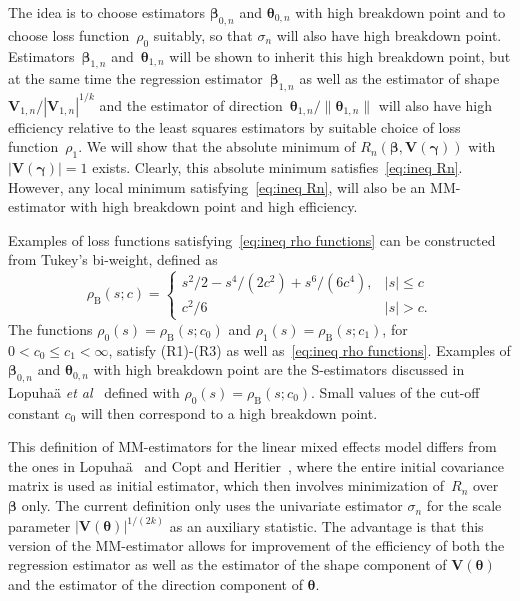 \documentclass{article}
\numberwithin{equation}{section}
\theoremstyle{plain}
\newcommand{\bbeta}{\bm\beta}
\newcommand{\btheta}{\bm\theta}
\newcommand{\bgamma}{\bm\gamma}
\newcommand{\bV}{\mathbf{V}}
\begin{document}
The idea is to choose estimators $\bbeta_{0,n}$ and $\btheta_{0,n}$ with high breakdown point
and to choose loss function~$\rho_0$ suitably, so that $\sigma_n$ will also have high breakdown point.
Estimators~$\bbeta_{1,n}$ and~$\btheta_{1,n}$ will be shown to inherit this high breakdown point, 
but at the same time the regression estimator~$\bbeta_{1,n}$ as well as the estimator of shape $\bV_{1,n}/|\bV_{1,n}|^{1/k}$
and the estimator of direction~$\btheta_{1,n}/\|\btheta_{1,n}\|$ will also have high efficiency relative to the least squares estimators
by suitable choice of loss function~$\rho_1$.
We will show that the absolute minimum of $R_n(\bbeta,\bV(\bgamma))$ with $|\bV(\bgamma)|=1$ exists.
Clearly, this absolute minimum satisfies~\eqref{eq:ineq Rn}.
However, any local minimum satisfying~\eqref{eq:ineq Rn}, will also be an MM-estimator
with high breakdown point and high efficiency.

Examples of loss functions satisfying~\eqref{eq:ineq rho functions} can be constructed from 
Tukey's bi-weight, defined as
\begin{equation}
\label{def:biweight}
\rho_{\mathrm{B}}(s;c)
=
\begin{cases}
s^2/2-s^4/(2c^2)+s^6/(6c^4), & |s|\leq c\\
c^2/6 & |s|>c.
\end{cases}
\end{equation}
The functions $\rho_0(s)=\rho_{\mathrm{B}}(s;c_0)$ and $\rho_1(s)=\rho_{\mathrm{B}}(s;c_1)$, for $0<c_0\leq c_1<\infty$,
satisfy (R1)-(R3) as well as~\eqref{eq:ineq rho functions}.
Examples of $\bbeta_{0,n}$ and $\btheta_{0,n}$ with high breakdown point are the S-estimators 
discussed in Lopuha\"a \textit{et al}~\cite{lopuhaa-gares-ruizgazen2023} defined with $\rho_0(s)=\rho_{\mathrm{B}}(s;c_0)$.
Small values of the cut-off constant $c_0$ will then correspond to a high breakdown point.

This definition of MM-estimators for the linear mixed effects model differs from the ones in Lopuha\"a~\cite{lopuhaa2023} and
Copt and Heritier~\cite{copt&heritier2007}, where 
the entire initial covariance matrix is used as initial estimator,
which then involves minimization of~$R_n$ over $\bbeta$ only.
The current definition only uses the univariate estimator $\sigma_n$ for the scale parameter 
$|\bV(\btheta)|^{1/(2k)}$ as an auxiliary statistic.
The advantage is that this version of the MM-estimator allows for improvement of the efficiency of both the regression estimator 
as well as the estimator of the shape component of $\bV(\btheta)$ and the estimator of the direction component of $\btheta$.
\end{document}
